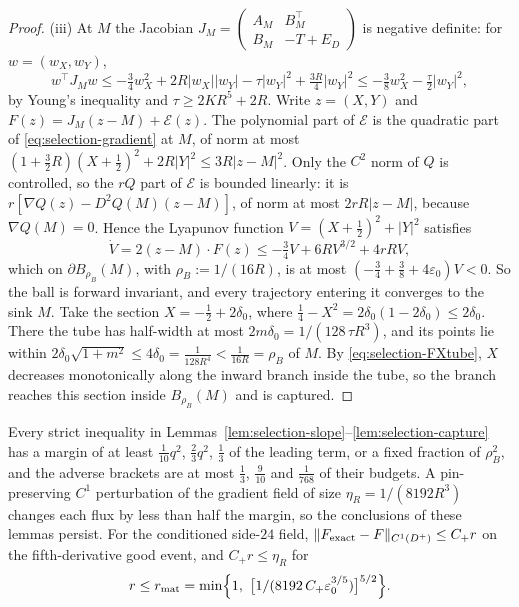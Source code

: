 \begin{proof}
(iii) At $M$ the Jacobian $J_M=\begin{pmatrix}A_M&B_M^{\top}\\B_M&-T+E_D\end{pmatrix}$ is negative definite: for $w=(w_X,w_Y)$,
\[
w^{\top}J_Mw\le-\tfrac34w_X^2+2R|w_X||w_Y|-\tau|w_Y|^2+\tfrac{3R}4|w_Y|^2\le-\tfrac38w_X^2-\tfrac\tau2|w_Y|^2,
\]
by Young's inequality and $\tau\ge2KR^5+2R$. Write $z=(X,Y)$ and $F(z)=J_M(z-M)+\mathcal E(z)$. The polynomial part of $\mathcal E$ is the quadratic part of \eqref{eq:selection-gradient} at $M$, of norm at most $(1+\frac32R)(X+\frac12)^2+2R|Y|^2\le3R|z-M|^2$. Only the $C^2$ norm of $Q$ is controlled, so the $rQ$ part of $\mathcal E$ is bounded linearly: it is $r[\nabla Q(z)-D^2Q(M)(z-M)]$, of norm at most $2rR|z-M|$, because $\nabla Q(M)=0$. Hence the Lyapunov function $V=(X+\frac12)^2+|Y|^2$ satisfies
\[
\dot V=2(z-M)\cdot F(z)\le-\tfrac34V+6RV^{3/2}+4rRV,
\]
which on $\partial B_{\rho_B}(M)$, with $\rho_B:=1/(16R)$, is at most $(-\frac34+\frac38+4\varepsilon_0)V<0$. So the ball is forward invariant, and every trajectory entering it converges to the sink $M$. Take the section $X=-\frac12+2\delta_0$, where $\frac14-X^2=2\delta_0(1-2\delta_0)\le2\delta_0$. There the tube has half-width at most $2m\delta_0=1/(128\,\tau R^3)$, and its points lie within $2\delta_0\sqrt{1+m^2}\le4\delta_0=\frac1{128R^4}<\frac1{16R}=\rho_B$ of $M$. By \eqref{eq:selection-FXtube}, $X$ decreases monotonically along the inward branch inside the tube, so the branch reaches this section inside $B_{\rho_B}(M)$ and is captured.
\end{proof}

\begin{lemma}\label{lem:selection-robust}
Every strict inequality in Lemmas~\ref{lem:selection-slope}--\ref{lem:selection-capture} has a margin of at least $\frac1{10}q^2$, $\frac23q^2$, $\frac13$ of the leading term, or a fixed fraction of $\rho_B^2$, and the adverse brackets are at most $\frac13$, $\frac9{10}$ and $\frac1{768}$ of their budgets. A pin-preserving $C^1$ perturbation of the gradient field of size $\eta_R=1/(8192R^3)$ changes each flux by less than half the margin, so the conclusions of these lemmas persist. For the conditioned side-$24$ field, $\|F_{\rm exact}-F\|_{C^1(D^+)}\le C_+r$ on the fifth-derivative good event, and $C_+r\le\eta_R$ for
\begin{equation}\label{eq:selection-rmat}
r\le r_{\rm mat}=\min\Bigl\{1,\ \bigl[1/(8192\,C_+\varepsilon_0^{3/5})\bigr]^{5/2}\Bigr\}.
\end{equation}
\end{lemma}

